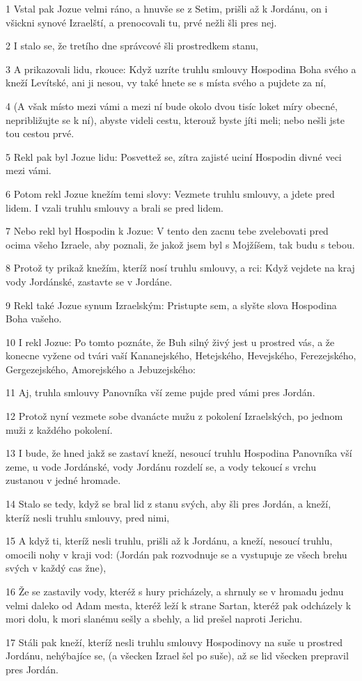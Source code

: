 \par 1 Vstal pak Jozue velmi ráno, a hnuvše se z Setim, prišli až k Jordánu, on i všickni synové Izraelští, a prenocovali tu, prvé nežli šli pres nej.
\par 2 I stalo se, že tretího dne správcové šli prostredkem stanu,
\par 3 A prikazovali lidu, rkouce: Když uzríte truhlu smlouvy Hospodina Boha svého a kneží Levítské, ani ji nesou, vy také hnete se s místa svého a pujdete za ní,
\par 4 (A však místo mezi vámi a mezi ní bude okolo dvou tisíc loket míry obecné, nepribližujte se k ní), abyste videli cestu, kterouž byste jíti meli; nebo nešli jste tou cestou prvé.
\par 5 Rekl pak byl Jozue lidu: Posvettež se, zítra zajisté uciní Hospodin divné veci mezi vámi.
\par 6 Potom rekl Jozue knežím temi slovy: Vezmete truhlu smlouvy, a jdete pred lidem. I vzali truhlu smlouvy a brali se pred lidem.
\par 7 Nebo rekl byl Hospodin k Jozue: V tento den zacnu tebe zvelebovati pred ocima všeho Izraele, aby poznali, že jakož jsem byl s Mojžíšem, tak budu s tebou.
\par 8 Protož ty prikaž knežím, kteríž nosí truhlu smlouvy, a rci: Když vejdete na kraj vody Jordánské, zastavte se v Jordáne.
\par 9 Rekl také Jozue synum Izraelským: Pristupte sem, a slyšte slova Hospodina Boha vašeho.
\par 10 I rekl Jozue: Po tomto poznáte, že Buh silný živý jest u prostred vás, a že konecne vyžene od tvári vaší Kananejského, Hetejského, Hevejského, Ferezejského, Gergezejského, Amorejského a Jebuzejského:
\par 11 Aj, truhla smlouvy Panovníka vší zeme pujde pred vámi pres Jordán.
\par 12 Protož nyní vezmete sobe dvanácte mužu z pokolení Izraelských, po jednom muži z každého pokolení.
\par 13 I bude, že hned jakž se zastaví kneží, nesoucí truhlu Hospodina Panovníka vší zeme, u vode Jordánské, vody Jordánu rozdelí se, a vody tekoucí s vrchu zustanou v jedné hromade.
\par 14 Stalo se tedy, když se bral lid z stanu svých, aby šli pres Jordán, a kneží, kteríž nesli truhlu smlouvy, pred nimi,
\par 15 A když ti, kteríž nesli truhlu, prišli až k Jordánu, a kneží, nesoucí truhlu, omocili nohy v kraji vod: (Jordán pak rozvodnuje se a vystupuje ze všech brehu svých v každý cas žne),
\par 16 Že se zastavily vody, kteréž s hury pricházely, a shrnuly se v hromadu jednu velmi daleko od Adam mesta, kteréž leží k strane Sartan, kteréž pak odcházely k mori dolu, k mori slanému sešly a sbehly, a lid prešel naproti Jerichu.
\par 17 Stáli pak kneží, kteríž nesli truhlu smlouvy Hospodinovy na suše u prostred Jordánu, nehýbajíce se, (a všecken Izrael šel po suše), až se lid všecken prepravil pres Jordán.

